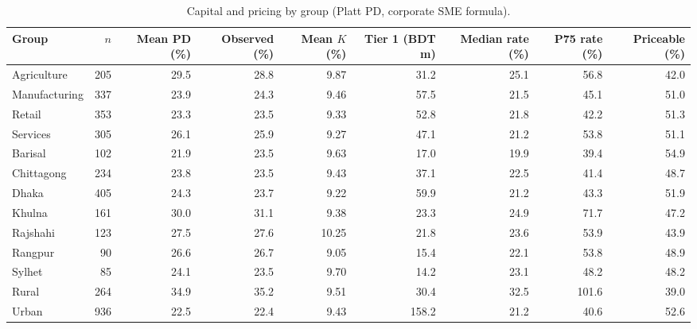 \documentclass[11pt,a4paper]{article}
\newcommand{\tabsize}{\footnotesize}
\begin{document}
\begin{table}[H]\centering\tabsize\setlength{\tabcolsep}{3pt}\caption{Capital and pricing by group (Platt PD, corporate SME formula).}\label{tab:groups}
\begin{adjustbox}{max width=\textwidth}
\begin{tabular}{lrrrrrrrr}
\toprule
Group & $n$ & Mean PD (\%) & Observed (\%) & Mean $K$ (\%) & Tier 1 (BDT m) & Median rate (\%) & P75 rate (\%) & Priceable (\%) \\
\midrule
Agriculture & 205 & 29.5 & 28.8 & 9.87 & 31.2 & 25.1 & 56.8 & 42.0 \\
Manufacturing & 337 & 23.9 & 24.3 & 9.46 & 57.5 & 21.5 & 45.1 & 51.0 \\
Retail & 353 & 23.3 & 23.5 & 9.33 & 52.8 & 21.8 & 42.2 & 51.3 \\
Services & 305 & 26.1 & 25.9 & 9.27 & 47.1 & 21.2 & 53.8 & 51.1 \\
\midrule
Barisal & 102 & 21.9 & 23.5 & 9.63 & 17.0 & 19.9 & 39.4 & 54.9 \\
Chittagong & 234 & 23.8 & 23.5 & 9.43 & 37.1 & 22.5 & 41.4 & 48.7 \\
Dhaka & 405 & 24.3 & 23.7 & 9.22 & 59.9 & 21.2 & 43.3 & 51.9 \\
Khulna & 161 & 30.0 & 31.1 & 9.38 & 23.3 & 24.9 & 71.7 & 47.2 \\
Rajshahi & 123 & 27.5 & 27.6 & 10.25 & 21.8 & 23.6 & 53.9 & 43.9 \\
Rangpur & 90 & 26.6 & 26.7 & 9.05 & 15.4 & 22.1 & 53.8 & 48.9 \\
Sylhet & 85 & 24.1 & 23.5 & 9.70 & 14.2 & 23.1 & 48.2 & 48.2 \\
\midrule
Rural & 264 & 34.9 & 35.2 & 9.51 & 30.4 & 32.5 & 101.6 & 39.0 \\
Urban & 936 & 22.5 & 22.4 & 9.43 & 158.2 & 21.2 & 40.6 & 52.6 \\
\bottomrule
\end{tabular}
\end{adjustbox}\end{table}
\end{document}
